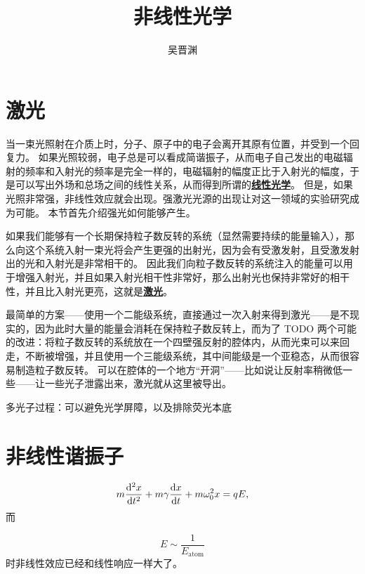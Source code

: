 \documentclass[UTF8, a4paper]{ctexart}
\title{非线性光学}
\author{吴晋渊}
\newcommand{\concept}[1]{\underline{\textbf{#1}}}
\begin{document}
\maketitle

\section{激光}

当一束光照射在介质上时，分子、原子中的电子会离开其原有位置，并受到一个回复力。
如果光照较弱，电子总是可以看成简谐振子，从而电子自己发出的电磁辐射的频率和入射光的频率是完全一样的，电磁辐射的幅度正比于入射光的幅度，于是可以写出外场和总场之间的线性关系，从而得到所谓的\concept{线性光学}。
但是，如果光照非常强，非线性效应就会出现。强激光光源的出现让对这一领域的实验研究成为可能。
本节首先介绍强光如何能够产生。

如果我们能够有一个长期保持粒子数反转的系统（显然需要持续的能量输入），那么向这个系统入射一束光将会产生更强的出射光，因为会有受激发射，且受激发射出的光和入射光是非常相干的。
因此我们向粒子数反转的系统注入的能量可以用于增强入射光，并且如果入射光相干性非常好，那么出射光也保持非常好的相干性，并且比入射光更亮，这就是\concept{激光}。

最简单的方案——使用一个二能级系统，直接通过一次入射来得到激光——是不现实的，因为此时大量的能量会消耗在保持粒子数反转上，而为了 TODO
两个可能的改进：将粒子数反转的系统放在一个四壁强反射的腔体内，从而光束可以来回走，不断被增强，并且使用一个三能级系统，其中间能级是一个亚稳态，从而很容易制造粒子数反转。
可以在腔体的一个地方“开洞”——比如说让反射率稍微低一些——让一些光子泄露出来，激光就从这里被导出。

多光子过程：可以避免光学屏障，以及排除荧光本底

\section{非线性谐振子}

\begin{equation}
    m \dv[2]{x}{t} + m \gamma \dv{x}{t} + m \omega_0^2 x = q E,
\end{equation}
而

\begin{equation}
    E \sim \frac{1}{E_\text{atom}}
\end{equation}
时非线性效应已经和线性响应一样大了。
\end{document}
